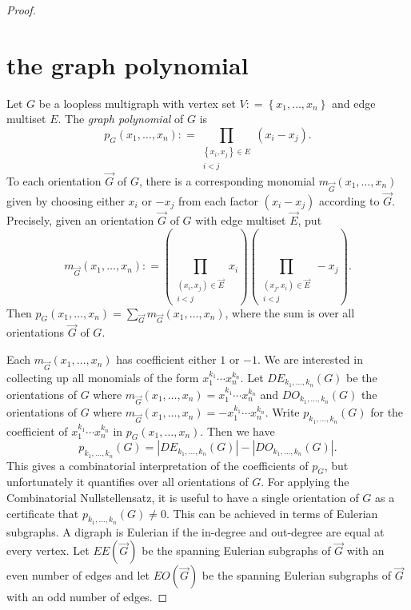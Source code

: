 \documentclass{amsbook}
\theoremstyle{plain}
\numberwithin{equation}{chapter}
\newcommand{\set}[1]{\left\{ #1 \right\}}
\newcommand{\parens}[1]{\left( #1 \right)}
\newcommand{\DefinedAs}{\mathrel{\mathop:}=}
\begin{document}
\begin{proof}
\section*{the graph polynomial}
Let $G$ be a loopless multigraph with vertex set $V \DefinedAs \set{x_1, \ldots, x_n}$ and edge multiset $E$.  The \emph{graph polynomial} of $G$ is
\[p_G(x_1,\ldots,x_n) \DefinedAs \prod_{\substack{\set{x_i,x_j} \in E\\i < j}} (x_i - x_j).\]
To each orientation $\vec{G}$ of $G$, there is a corresponding monomial $m_{\vec{G}}(x_1,\ldots, x_n)$ given by choosing either $x_i$ or $-x_j$ from each factor $(x_i - x_j)$ according to $\vec{G}$. Precisely, given an orientation $\vec{G}$ of $G$ with edge multiset $\vec{E}$, put
\[m_{\vec{G}}(x_1,\ldots, x_n) \DefinedAs \parens{\prod_{\substack{(x_i,x_j) \in \vec{E}\\i < j}} x_i}\parens{\prod_{\substack{(x_j,x_i) \in \vec{E}\\i < j}} -x_j}.\]
Then $p_G(x_1,\ldots,x_n) = \sum_{\vec{G}} m_{\vec{G}}(x_1,\ldots, x_n)$, where the sum is over all orientations $\vec{G}$ of $G$.  

Each $m_{\vec{G}}(x_1,\ldots, x_n)$ has coefficient either $1$ or $-1$.   We are interested in collecting up all monomials of the form $x_1^{k_1}\cdots x_n^{k_n}$.  Let $DE_{k_1,\ldots, k_n}(G)$ be the orientations of $G$ where $m_{\vec{G}}(x_1,\ldots, x_n) = x_1^{k_1}\cdots x_n^{k_n}$ and $DO_{k_1,\ldots, k_n}(G)$ the orientations of $G$ where $m_{\vec{G}}(x_1,\ldots, x_n) = -x_1^{k_1}\cdots x_n^{k_n}$.  Write $p_{k_1, \ldots, k_n}(G)$ for the coefficient of $x_1^{k_1}\cdots x_n^{k_n}$ in $p_G(x_1,\ldots,x_n)$.  Then we have
\[p_{k_1, \ldots, k_n}(G) = |DE_{k_1,\ldots, k_n}(G)| - |DO_{k_1,\ldots, k_n}(G)|.\]
This gives a combinatorial interpretation of the coefficients of $p_G$, but unfortunately it quantifies over all orientations of $G$.  For applying the Combinatorial Nullstellensatz, it is useful to have a single orientation of $G$ as a certificate that $p_{k_1, \ldots, k_n}(G) \ne 0$.  This can be achieved in terms of Eulerian subgraphs.  A digraph is Eulerian if the in-degree and out-degree are equal at every vertex.  Let $EE(\vec{G})$ be the spanning Eulerian subgraphs of $\vec{G}$ with an even number of edges and let $EO(\vec{G})$ be the spanning Eulerian subgraphs of $\vec{G}$ with an odd number of edges.  


\end{proof}
\end{document}
